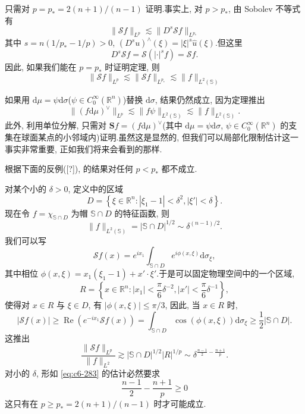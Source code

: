 \begin{remark}\label{rem:c6-8.4}
只需对 $p = p_* = 2(n+1)/(n-1)$ 证明.事实上, 对 $p > p_*$, 由 Sobolev 不等式有
\[
\|\mathcal{S} f\|_{L^p} \lesssim \|D^s \mathcal{S} f\|_{L^{p_*}}
\]
其中 $s = n(1/p_* - 1/p) > 0$, $(D^s u)^\wedge (\xi) = |\xi|^s \hat{u}(\xi)$.但这里
\[
D^s \mathcal{S} f = \mathcal{S}(|\cdot|^s f) = \mathcal{S} f.
\]
因此, 如果我们能在 $p = p_*$ 时证明定理, 则
\[
\|\mathcal{S} f\|_{L^p} \lesssim \|\mathcal{S} f\|_{L^{p_*}} \lesssim \|f\|_{L^2(\mathbb{S})}
\]
\end{remark}

\begin{remark}\label{rem:c6-8.5}
如果用 $\mathrm{d}\mu = \psi \mathrm{d}\sigma$($\psi \in C_0^\infty(\mathbb{R}^n)$)替换 $\mathrm{d}\sigma$, 结果仍然成立, 因为定理推出
\[
\|(f \mathrm{d}\mu)^\vee\|_{L^p} \lesssim \|f \psi\|_{L^2(\mathbb{S})} \lesssim \|f\|_{L^2(\mathbb{S})}.
\]
此外, 利用单位分解, 只需对 $\boldsymbol{S} f = (f \mathrm{d}\mu)^\vee$(其中 $\mathrm{d}\mu = \psi \mathrm{d}\sigma$, $\psi \in C_0^\infty(\mathbb{R}^n)$ 的支集在球面某点的小邻域内)证明.虽然这是显然的, 但我们可以局部化限制估计这一事实非常重要, 正如我们将来会看到的那样.
\end{remark}


根据下面的反例([?]),  的结果对任何 $p < p_*$ 都不成立.

对某个小的 $\delta > 0$, 定义中的区域
\[
D = \left\{\xi \in \mathbb{R}^n: |\xi_1 - 1| < \delta^2, |\xi'| < \delta\right\}.
\]
现在令 $f = \chi_{\mathbb{S} \cap D}$ 为帽 $\mathbb{S} \cap D$ 的特征函数, 则
\[
\|f\|_{L^2(\mathbb{S})} = |\mathbb{S} \cap D|^{1/2} \sim \delta^{(n-1)/2}.
\]
我们可以写
\[
\mathcal{S} f(x) = e^{ix_1} \int_{\mathbb{S} \cap D} e^{i\phi(x, \xi)} \mathrm{d}\sigma_\xi,
\]
其中相位 $\phi(x, \xi) = x_1(\xi_1 - 1) + x' \cdot \xi'$.于是可以固定物理空间中的一个区域,
\[
R = \left\{x \in \mathbb{R}^n: |x_1| < \frac{\pi}{6} \delta^{-2}, |x'| < \frac{\pi}{6} \delta^{-1}\right\},
\]
使得对 $x \in R$ 与 $\xi \in D$, 有 $|\phi(x, \xi)| \le \pi/3$, 因此, 当 $x \in R$ 时,
\[
|\mathcal{S} f(x)| \geq \operatorname{Re}\left(e^{-ix_1} \mathcal{S} f(x)\right) = \int_{\mathbb{S} \cap D} \cos(\phi(x, \xi)) \mathrm{d}\sigma_\xi \geq \frac{1}{2} |\mathbb{S} \cap D|.
\]
这推出
\[
\frac{\|\mathcal{S} f\|_{L^p}}{\|f\|_{L^2}} \gtrsim |\mathbb{S} \cap D|^{1/2} |R|^{1/p} \sim \delta^{\frac{n-1}{2} - \frac{n+1}{p}}.
\]
对小的 $\delta$, 形如 \eqref{eq:c6-283} 的估计必然要求
\[
\frac{n-1}{2} - \frac{n+1}{p} \geq 0
\]
这只有在 $p \geq p_* = 2(n+1)/(n-1)$ 时才可能成立.

